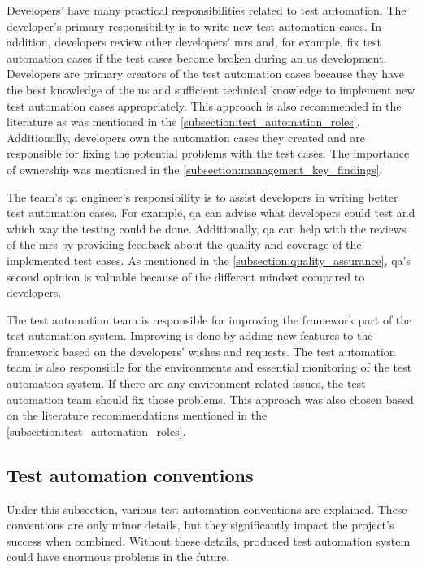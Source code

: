 Developers' have many practical responsibilities related to test automation. The developer's primary responsibility is to write new test automation cases. In addition, developers review other developers' \glspl{mr} and, for example, fix test automation cases if the test cases become broken during an \gls{us} development. Developers are primary creators of the test automation cases because they have the best knowledge of the \gls{us} and sufficient technical knowledge to implement new test automation cases appropriately. This approach is also recommended in the literature as was mentioned in the \autoref{subsection:test_automation_roles}. Additionally, developers own the automation cases they created and are responsible for fixing the potential problems with the test cases. The importance of ownership was mentioned in the \autoref{subsection:management_key_findings}.

The team's \gls{qa} engineer's responsibility is to assist developers in writing better test automation cases. For example, \gls{qa} can advise what developers could test and which way the testing could be done. Additionally, \gls{qa} can help with the reviews of the \glspl{mr} by providing feedback about the quality and coverage of the implemented test cases. As mentioned in the \autoref{subsection:quality_assurance}, \gls{qa}'s second opinion is valuable because of the different mindset compared to developers.

The test automation team is responsible for improving the framework part of the test automation system. Improving is done by adding new features to the framework based on the developers' wishes and requests. The test automation team is also responsible for the environments and essential monitoring of the test automation system. If there are any environment-related issues, the test automation team should fix those problems. This approach was also chosen based on the literature recommendations mentioned in the \autoref{subsection:test_automation_roles}.

\subsection{Test automation conventions}\label{subsection:test_automation_conventions}
Under this subsection, various test automation conventions are explained. These conventions are only minor details, but they significantly impact the project's success when combined. Without these details, produced test automation system could have enormous problems in the future.

